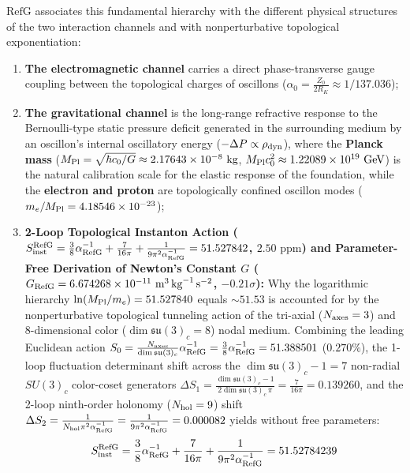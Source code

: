 \documentclass[11pt,a4paper]{article}
\newcommand{\RefG}{\mathrm{RefG}}
\begin{document}
$\RefG$ associates this fundamental hierarchy with the different physical structures of the two interaction channels and with nonperturbative topological exponentiation:
\begin{enumerate}[label=\arabic*.]
\item \textbf{The electromagnetic channel} carries a direct phase-transverse gauge coupling between the topological charges of oscillons ($\alpha_0 = \frac{Z_0}{2 R_K} \approx 1/137.036$);
\item \textbf{The gravitational channel} is the long-range refractive response to the Bernoulli-type static pressure deficit generated in the surrounding medium by an oscillon's internal oscillatory energy ($-\Delta P \propto \rho_{\rm dyn}$), where the \textbf{Planck mass} ($M_{\rm Pl}=\sqrt{\hbar c_0/G}\approx2.17643\times10^{-8}\text{ kg}$, $M_{\rm Pl}c_0^2\approx1.22089\times10^{19}\text{ GeV}$) is the natural calibration scale for the elastic response of the foundation, while the \textbf{electron and proton} are topologically confined oscillon modes ($m_e/M_{\rm Pl} = 4.18546\times 10^{-23}$);
\item \textbf{2-Loop Topological Instanton Action ($S_{\rm inst}^{\rm RefG} = \frac{3}{8}\alpha_{\rm RefG}^{-1} + \frac{7}{16\pi} + \frac{1}{9\pi^2\alpha_{\rm RefG}^{-1}} = 51.527842$, $2.50\text{ ppm}$) and Parameter-Free Derivation of Newton's Constant $G$ ($G_{\rm RefG} = 6.674268\times 10^{-11}\text{ m}^3\,\text{kg}^{-1}\,\text{s}^{-2}$, $-0.21\sigma$):} Why the logarithmic hierarchy $\ln(M_{\rm Pl}/m_e) = 51.527840$ equals $\sim 51.53$ is accounted for by the nonperturbative topological tunneling action of the tri-axial ($N_{\rm axes} = 3$) and 8-dimensional color ($\dim\mathfrak{su}(3)_c = 8$) nodal medium. Combining the leading Euclidean action $S_0 = \frac{N_{\rm axes}}{\dim\mathfrak{su}(3)_c}\alpha_{\rm RefG}^{-1} = \frac{3}{8}\alpha_{\rm RefG}^{-1} = 51.388501$ ($0.270\%$), the 1-loop fluctuation determinant shift across the $\dim\mathfrak{su}(3)_c - 1 = 7$ non-radial $SU(3)_c$ color-coset generators $\Delta S_1 = \frac{\dim\mathfrak{su}(3)_c - 1}{2\dim\mathfrak{su}(3)_c\,\pi} = \frac{7}{16\pi} = 0.139260$, and the 2-loop ninth-order holonomy ($N_{\rm hol} = 9$) shift $\Delta S_2 = \frac{1}{N_{\rm hol}\pi^2\alpha_{\rm RefG}^{-1}} = \frac{1}{9\pi^2\alpha_{\rm RefG}^{-1}} = 0.000082$ yields without free parameters:
\begin{equation}
\begin{aligned}
S_{\rm inst}^{\rm RefG} &= \frac{3}{8}\alpha_{\rm RefG}^{-1} + \frac{7}{16\pi} + \frac{1}{9\pi^2\alpha_{\rm RefG}^{-1}} = 51.52784239 \\

\end{aligned}
\end{equation}
\end{enumerate}
\end{document}
